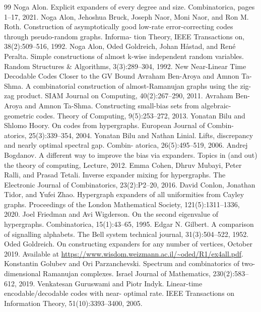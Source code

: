 \documentclass[10pt,a4paper]{article}
\begin{document}
\begin{thebibliography}{99}
 Noga Alon. Explicit expanders of every degree and size. Combinatorica, pages 1–17, 2021.
 Noga Alon, Jehoshua Bruck, Joseph Naor, Moni Naor, and Ron M. Roth. Construction of asymptotically good low-rate error-correcting codes through pseudo-random graphs. Informa- tion Theory, IEEE Transactions on, 38(2):509–516, 1992.
 Noga Alon, Oded Goldreich, Johan Håstad, and René Peralta. Simple constructions of almost k-wise independent random variables. Random Structures \& Algorithms, 3(3):289–304, 1992. New Near-Linear Time Decodable Codes Closer to the GV Bound
 Avraham Ben-Aroya and Amnon Ta-Shma. A combinatorial construction of almost-Ramanujan graphs using the zig-zag product. SIAM Journal on Computing, 40(2):267–290, 2011.
 Avraham Ben-Aroya and Amnon Ta-Shma. Constructing small-bias sets from algebraic- geometric codes. Theory of Computing, 9(5):253–272, 2013.
 Yonatan Bilu and Shlomo Hoory. On codes from hypergraphs. European Journal of Combin- atorics, 25(3):339–354, 2004.
 Yonatan Bilu and Nathan Linial. Lifts, discrepancy and nearly optimal spectral gap. Combin- atorica, 26(5):495–519, 2006.
 Andrej Bogdanov. A different way to improve the bias via expanders. Topics in (and out) the theory of computing, Lecture, 2012.
 Emma Cohen, Dhruv Mubayi, Peter Ralli, and Prasad Tetali. Inverse expander mixing for hypergraphs. The Electronic Journal of Combinatorics, 23(2):P2–20, 2016.
 David Conlon, Jonathan Tidor, and Yufei Zhao. Hypergraph expanders of all uniformities from Cayley graphs. Proceedings of the London Mathematical Society, 121(5):1311–1336, 2020.
 Joel Friedman and Avi Wigderson. On the second eigenvalue of hypergraphs. Combinatorica, 15(1):43–65, 1995.
 Edgar N. Gilbert. A comparison of signalling alphabets. The Bell system technical journal, 31(3):504–522, 1952.
 Oded Goldreich. On constructing expanders for any number of vertices, October 2019. Available at \url{https://www.wisdom.weizmann.ac.il/~oded/R1/ex4all.pdf}.
 Konstantin Golubev and Ori Parzanchevski. Spectrum and combinatorics of two-dimensional Ramanujan complexes. Israel Journal of Mathematics, 230(2):583–612, 2019.
 Venkatesan Guruswami and Piotr Indyk. Linear-time encodable/decodable codes with near- optimal rate. IEEE Transactions on Information Theory, 51(10):3393–3400, 2005.

\end{thebibliography}
\end{document}
